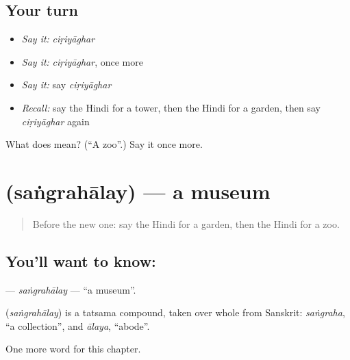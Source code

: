 \subsection*{Your turn}
\begin{itemize}
\raggedright
  \item \emph{Say it:} \emph{ciṛiyāghar}
  \item \emph{Say it:} \emph{ciṛiyāghar}, once more
  \item \emph{Say it:} say \emph{ciṛiyāghar}
  \item \emph{Recall:} say the Hindi for a tower, then the Hindi for a garden, then say \emph{ciṛiyāghar} again
\end{itemize}

\begin{tcolorbox}[breakable,colback=teal!4,colframe=teal!35!black,title={Before you move on}]
What does  mean? (\textquotedblleft{}A zoo\textquotedblright{}.) Say it once more.
\end{tcolorbox}
\section[\texorpdfstring{\hi{संग्रहालय} (saṅgrahālay)}{संग्रहालय (saṅgrahālay)}]{ (saṅgrahālay) — a museum}

\label{lesson:HI-C203-sangrahalay}



\begin{quote}
Before the new one: say the Hindi for a garden, then the Hindi for a zoo.
\end{quote}

\subsection*{You'll want to know: }
\textbf{} — \emph{saṅgrahālay} — \textquotedblleft{}a museum\textquotedblright{}.

\begin{cousinweb}
\textbf{} (\emph{saṅgrahālay}) is a tatsama compound, taken over whole from Sanskrit: \emph{saṅgraha}, \textquotedblleft{}a collection\textquotedblright{}, and \emph{ālaya}, \textquotedblleft{}abode\textquotedblright{}.
\end{cousinweb}

\begin{grammarlens}[title={What you've built}]
One more word for this chapter.
\end{grammarlens}

